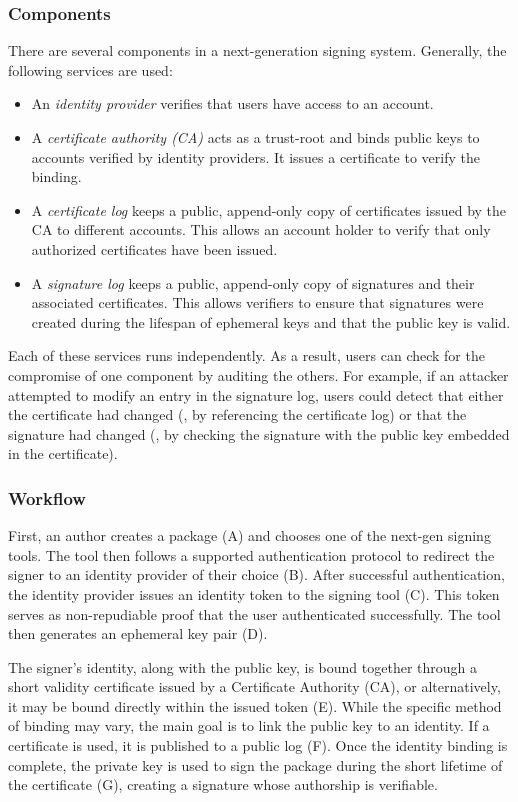 \documentclass{IEEEcsmagTechrxiv}
\begin{document}
\subsubsection{Components}
There are several components in a next-generation signing system.
Generally, the following services are used:
\begin{itemize}
    \item An \textit{identity provider} verifies that users have access to an account.
    \item A \textit{certificate authority (CA)} acts as a trust-root and binds public keys to accounts verified by identity providers.
    It issues a certificate to verify the binding.
    \item A \textit{certificate log} keeps a public, append-only copy of certificates issued by the CA to different accounts.
    This allows an account holder to verify that only authorized certificates have been issued.
    \item A \textit{signature log} keeps a public, append-only copy of signatures and their associated certificates.
    This allows verifiers to ensure that signatures were created during the lifespan of ephemeral keys and that the public key is valid.
\end{itemize}
Each of these services runs independently.
As a result, users can check for the compromise of one component by auditing the others.
For example, if an attacker attempted to modify an entry in the signature log, users could detect that either the certificate had changed (\ie, by referencing the certificate log) or that the signature had changed (\ie, by checking the signature with the public key embedded in the certificate).


\subsubsection{Workflow}
First, an author creates a package (A) and chooses one of the next-gen signing tools.
The tool then follows a supported authentication protocol to redirect the signer to an identity provider of their choice (B). After successful authentication, the identity provider issues an identity token to the signing tool (C). 
This token serves as non-repudiable proof that the user authenticated successfully. The tool then generates an ephemeral key pair (D).

The signer's identity, along with the public key, is bound together through a short validity certificate issued by a Certificate Authority (CA), or alternatively, it may be bound directly within the issued token (E).
While the specific method of binding may vary, the main goal is to link the public key to an identity.
If a certificate is used, it is published to a public log (F).
Once the identity binding is complete, the private key is used to sign the package during the short lifetime of the certificate (G), creating a signature whose authorship is verifiable.
\end{document}
